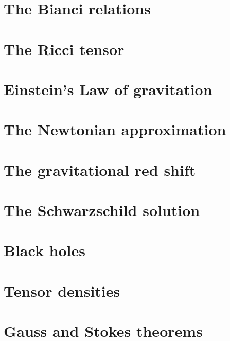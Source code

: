 \documentclass[12pt]{article}
\numberwithin{equation}{section}
\begin{document}
\section{The Bianci relations}

\section{The Ricci tensor}

\section{Einstein's Law of gravitation}

\section{The Newtonian approximation}

\section{The gravitational red shift}

\section{The Schwarzschild solution}

\section{Black holes}

\section{Tensor densities}

\section{Gauss and Stokes theorems}

\end{document}
